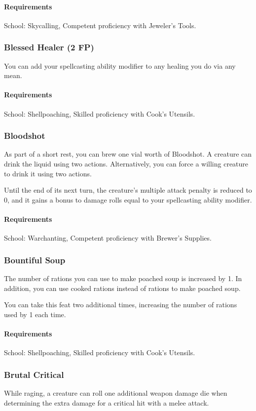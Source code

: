     \paragraph{Requirements} School: Skycalling, Competent proficiency with Jeweler's Tools.
\subsubsection{Blessed Healer (2 FP)} \label{feat::blessedhealer}
    You can add your spellcasting ability modifier to any healing you do via any mean.
    \paragraph{Requirements} School: Shellpoaching, Skilled proficiency with Cook's Utensils.
\subsubsection{Bloodshot} \label{feat::bloodshot}
    As part of a short rest, you can brew one vial worth of Bloodshot.
    A creature can drink the liquid using two actions.
    Alternatively, you can force a willing creature to drink it using two actions.

    Until the end of its next turn, the creature's multiple attack penalty is reduced to 0, and it gains a bonus to damage rolls equal to your spellcasting ability modifier.
    \paragraph{Requirements} School: Warchanting, Competent proficiency with Brewer's Supplies.
\subsubsection{Bountiful Soup} \label{feat::bountifulsoup}
    The number of rations you can use to make poached soup is increased by 1.
    In addition, you can use cooked rations instead of rations to make poached soup.

    You can take this feat two additional times, increasing the number of rations used by 1 each time.
    \paragraph{Requirements} School: Shellpoaching, Skilled proficiency with Cook's Utensils.
\subsubsection{Brutal Critical} \label{feat::brutalcritical}
    While raging, a creature can roll one additional weapon damage die when determining the extra damage for a critical hit with a melee attack.

